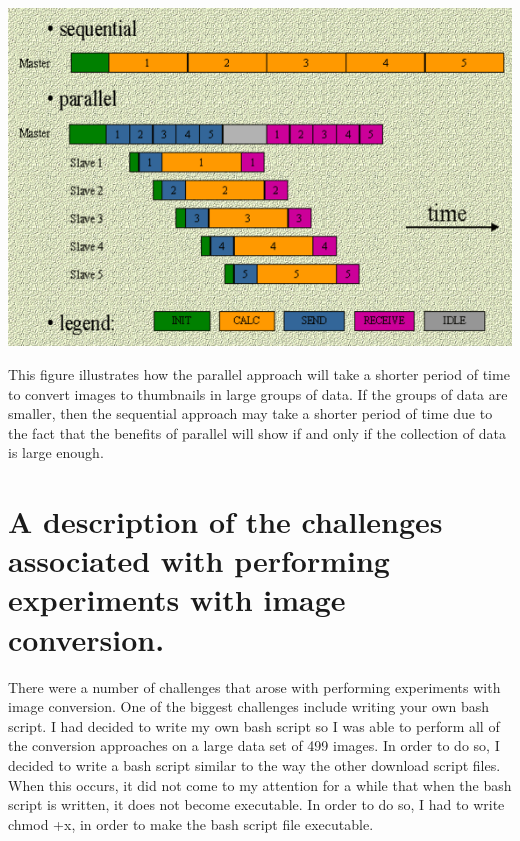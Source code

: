 \documentclass{article}
\begin{document}
\includegraphics[scale=0.5]{SvsP.png}

This figure illustrates how the parallel approach will take a shorter period of time to convert images to thumbnails in large groups of data. If the groups of data are smaller, then the sequential approach may take a shorter period of time due to the fact that the benefits of parallel will show if and only if the collection of data is large enough.

\section{A description of the challenges associated with performing experiments with image conversion.}
There were a number of challenges that arose with performing experiments with image conversion. One of the biggest challenges include writing your own bash script. I had decided to write my own bash script so I was able to perform all of the conversion approaches on a large data set of 499 images. In order to do so, I decided to write a bash script similar to the way the other download script files. When this occurs, it did not come to my attention for a while that when the bash script is written, it does not become executable. In order to do so, I had to write chmod +x, in order to make the bash script file executable.


\end{document}
